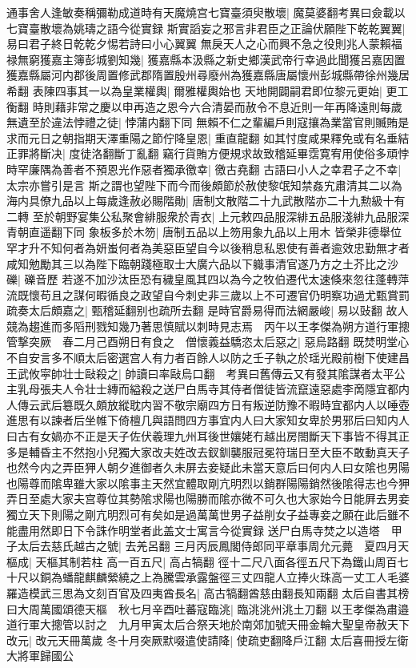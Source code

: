通事舍人逢敏奏稱彌勒成道時有天魔燒宫七寶臺須臾散壞|{
	魔莫婆翻考異曰僉載以七寶臺散壞為姚璹之語今從實録}
斯實謟妄之邪言非君臣之正論伏願陛下乾乾翼翼|{
	易曰君子終日乾乾夕惕若詩曰小心翼翼}
無戾天人之心而興不急之役則兆人蒙賴福禄無窮獲嘉主簿彭城劉知幾|{
	獲嘉縣本汲縣之新史鄉漢武帝行幸過此聞獲呂嘉因置獲嘉縣屬河内郡後周置修武郡隋置殷州尋廢州為獲嘉縣唐屬懷州彭城縣帶徐州幾居希翻}
表陳四事其一以為皇業權輿|{
	爾雅權輿始也}
天地開闢嗣君即位黎元更始|{
	更工衡翻}
時則藉非常之慶以申再造之恩今六合清晏而赦令不息近則一年再降遠則每歲無遺至於違法悖禮之徒|{
	悖蒲内翻下同}
無賴不仁之輩編戶則寇攘為業當官則贓賄是求而元日之朝指期天澤重陽之節佇降皇恩|{
	重直龍翻}
如其忖度咸果釋免或有名垂結正罪將斷决|{
	度徒洛翻斷丁亂翻}
竊行貨賄方便規求故致稽延畢霑寛宥用使俗多頑悖時罕廉隅為善者不預恩光作惡者獨承徼幸|{
	徼古堯翻}
古語曰小人之幸君子之不幸|{
	太宗亦嘗引是言}
斯之謂也望陛下而今而後頗節於赦使黎氓知禁姦宄肅清其二以為海内具僚九品以上每歲逢赦必賜階勛|{
	唐制文散階二十九武散階亦二十九勲級十有二轉}
至於朝野宴集公私聚會緋服衆於青衣|{
	上元敕四品服深緋五品服淺緋九品服深青朝直遥翻下同}
象板多於木笏|{
	唐制五品以上笏用象九品以上用木}
皆榮非德舉位罕才升不知何者為妍蚩何者為美惡臣望自今以後稍息私恩使有善者逾效忠勤無才者咸知勉勵其三以為陛下臨朝踐極取士大廣六品以下軄事清官遂乃方之土芥比之沙礫|{
	礫音歷}
若遂不加沙汰臣恐有穢皇風其四以為今之牧伯遷代太速倏來忽往蓬轉萍流既懷苟且之謀何暇循良之政望自今刺史非三歲以上不可遷官仍明察功過尤甄賞罰疏奏太后頗嘉之|{
	甄稽延翻别也疏所去翻}
是時官爵易得而法網嚴峻|{
	易以䜴翻}
故人競為趨進而多䧟刑戮知幾乃著思慎賦以刺時見志焉　丙午以王孝傑為朔方道行軍摠管撃突厥　春二月己酉朔日有食之　僧懷義益驕恣太后惡之|{
	惡烏路翻}
既焚明堂心不自安言多不順太后密選宫人有力者百餘人以防之壬子執之於瑶光殿前樹下使建昌王武攸寜帥壮士敺殺之|{
	帥讀曰率敺烏口翻　考異曰舊傳云又有發其隂謀者太平公主乳母張夫人令壮士縳而縊殺之送尸白馬寺其侍者僧徒皆流竄遠惡處李啇隱宜都内人傳云武后簒既久頗放縱耽内習不敬宗廟四方日有叛逆防豫不暇時宜都内人以唾壺進思有以諫者后坐帷下倚檀几與語問四方事宜内人曰大家知女卑於男邪后曰知内人曰古有女媧亦不正是天子佐伏羲理九州耳後世孃姥冇越出房閤斷天下事皆不得其正多是輔昏主不然抱小兒獨大家改夫姓改去釵釧襲服冠冕符瑞日至大臣不敢動真天子也然今内之弄臣狎人朝夕進御者久未屏去妾疑此未當天意后曰何内人曰女隂也男陽也陽尊而隂卑雖大家以隂事主天然宜體取剛亢明烈以銷群陽陽銷然後隂得志也今狎弄日至處大家夫宫尊位其勢隂求陽也陽勝而隂亦微不可久也大家始今日能屛去男妾獨立天下則陽之剛亢明烈可有矣如是過萬萬世男子益削女子益專妾之願在此后雖不能盡用然即日下令誅作明堂者此盖文士寓言今從實録}
送尸白馬寺焚之以造塔　甲子太后去慈氏越古之號|{
	去羌呂翻}
三月丙辰鳳閣侍郎同平章事周允元薨　夏四月天樞成|{
	天樞其制若柱}
高一百五尺|{
	高占犒翻}
徑十二尺八面各徑五尺下為鐵山周百七十尺以銅為蟠龍麒麟縈繞之上為騰雲承露盤徑三丈四龍人立捧火珠高一丈工人毛婆羅造模武三思為文刻百官及四夷酋長名|{
	高古犒翻酋慈由翻長知兩翻}
太后自書其榜曰大周萬國頌德天樞　秋七月辛酉吐蕃寇臨洮|{
	臨洮洮州洮土刀翻}
以王孝傑為肅邉道行軍大摠管以討之　九月甲寅太后合祭天地於南郊加號天冊金輪大聖皇帝赦天下改元|{
	改元天冊萬歲}
冬十月突厥默啜遣使請降|{
	使疏吏翻降戶江翻}
太后喜冊授左衛大將軍歸國公

